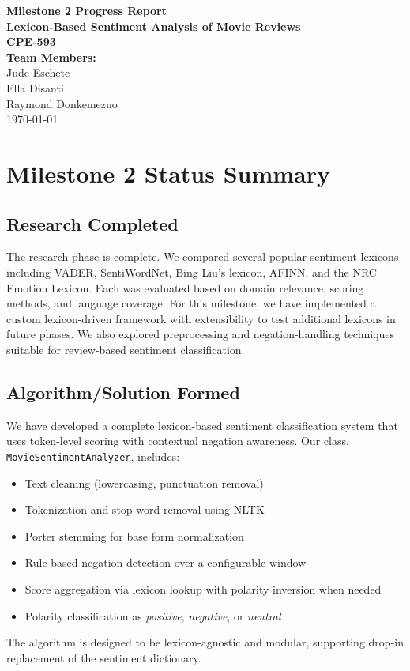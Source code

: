\documentclass[12pt]{article}
\begin{document}
	
	\begin{titlepage}
		\centering
		\vspace*{3cm}
		{\Huge \textbf{Milestone 2 Progress Report}}\\[1.5cm]
		{\LARGE \textbf{Lexicon-Based Sentiment Analysis of Movie Reviews}}\\[2cm]
		
			\large
			\textbf{CPE-593}\linebreak\\


			\textbf{Team Members:}\\
			Jude Eschete\\
			Ella Disanti\\
			Raymond Donkemezuo\\
		
		\vfill
		{\large \today}
	\end{titlepage}
	
	\section*{Milestone 2 Status Summary}
	
	\subsection*{Research Completed}
	The research phase is complete. We compared several popular sentiment lexicons including VADER, SentiWordNet, Bing Liu's lexicon, AFINN, and the NRC Emotion Lexicon. Each was evaluated based on domain relevance, scoring methods, and language coverage. For this milestone, we have implemented a custom lexicon-driven framework with extensibility to test additional lexicons in future phases. We also explored preprocessing and negation-handling techniques suitable for review-based sentiment classification.
	
	\subsection*{Algorithm/Solution Formed}
	We have developed a complete lexicon-based sentiment classification system that uses token-level scoring with contextual negation awareness. Our class, \texttt{MovieSentimentAnalyzer}, includes:
	\begin{itemize}
		\item Text cleaning (lowercasing, punctuation removal)
		\item Tokenization and stop word removal using NLTK
		\item Porter stemming for base form normalization
		\item Rule-based negation detection over a configurable window
		\item Score aggregation via lexicon lookup with polarity inversion when needed
		\item Polarity classification as \textit{positive}, \textit{negative}, or \textit{neutral}
	\end{itemize}
	The algorithm is designed to be lexicon-agnostic and modular, supporting drop-in replacement of the sentiment dictionary.
	
\end{document}
